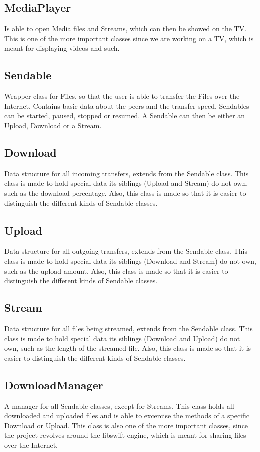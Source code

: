 \subsection{MediaPlayer}
Is able to open Media files and Streams, which can then be showed on the TV. This is one of the more important classes since we are working 
on a TV, which is meant for displaying videos and such.

\subsection{Sendable}
Wrapper class for Files, so that the user is able to transfer the Files over the Internet. Contains basic data about the peers and the transfer speed.
Sendables can be started, paused, stopped or resumed. A Sendable can then be either an Upload, Download or a Stream.

\subsection{Download}
Data structure for all incoming transfers, extends from the Sendable class. This class is made to hold special data its siblings (Upload and Stream)
do not own, such as the download percentage. Also, this class is made so that it is easier to distinguish the different kinds of Sendable classes.

\subsection{Upload}
Data structure for all outgoing transfers, extends from the Sendable class. This class is made to hold special data its siblings (Download and Stream)
do not own, such as the upload amount. Also, this class is made so that it is easier to distinguish the different kinds of Sendable classes.

\subsection{Stream}
Data structure for all files being streamed, extends from the Sendable class. This class is made to hold special data its siblings (Download and Upload)
do not own, such as the length of the streamed file. Also, this class is made so that it is easier to distinguish the different kinds of Sendable classes.

\subsection{DownloadManager}
A manager for all Sendable classes, except for Streams. This class holds all downloaded and uploaded files and is able to excercise the methods 
of a specific Download or Upload. This class is also one of the more important classes, since the project revolves around the libswift engine, which
is meant for sharing files over the Internet.


